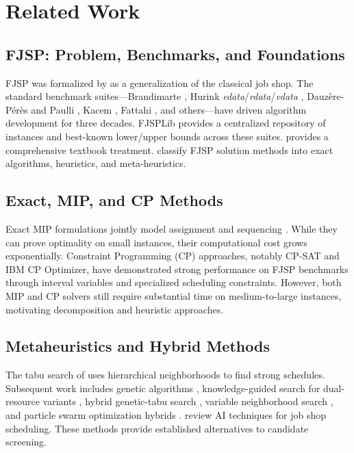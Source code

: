 \documentclass[conference]{IEEEtran}
\begin{document}
\section{Related Work}

\subsection{FJSP: Problem, Benchmarks, and Foundations}
FJSP was formalized by \cite{Brucker1990} as a generalization of the classical job shop. The standard benchmark suites---Brandimarte \cite{Brandimarte1993}, Hurink \textit{edata}/\textit{rdata}/\textit{vdata} \cite{Hurink1994}, Dauz\`ere-P\'er\`es and Paulli \cite{Dauzere1997}, Kacem \cite{Kacem2002}, Fattahi \cite{Fattahi2007}, and others---have driven algorithm development for three decades. FJSPLib provides a centralized repository of instances and best-known lower/upper bounds across these suites. \cite{Pinedo2016} provides a comprehensive textbook treatment. \cite{Xie2019} classify FJSP solution methods into exact algorithms, heuristics, and meta-heuristics.

\subsection{Exact, MIP, and CP Methods}
Exact MIP formulations jointly model assignment and sequencing \cite{Ozguven2010,Meng2020}. While they can prove optimality on small instances, their computational cost grows exponentially. Constraint Programming (CP) approaches, notably CP-SAT and IBM CP Optimizer, have demonstrated strong performance on FJSP benchmarks through interval variables and specialized scheduling constraints. However, both MIP and CP solvers still require substantial time on medium-to-large instances, motivating decomposition and heuristic approaches.

\subsection{Metaheuristics and Hybrid Methods}
The tabu search of \cite{Mastrolilli2000} uses hierarchical neighborhoods to find strong schedules. Subsequent work includes genetic algorithms \cite{Pezzella2008}, knowledge-guided search for dual-resource variants \cite{Zheng2016}, hybrid genetic-tabu search \cite{Li2016}, variable neighborhood search \cite{Gao2008}, and particle swarm optimization hybrids \cite{Xia2005}. \cite{Calis2015} review AI techniques for job shop scheduling. These methods provide established alternatives to candidate screening.
\end{document}
